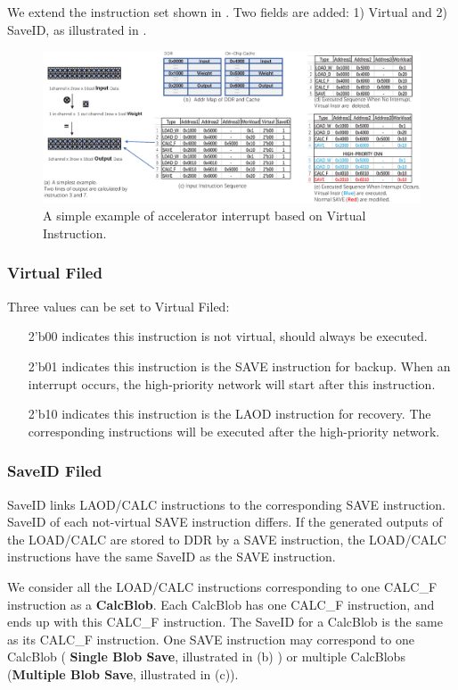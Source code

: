 We extend the instruction set shown in . Two fields are added: 1) Virtual and 2) SaveID, as illustrated in .

\begin{figure}[t]
	\centering
	\includegraphics[width=0.95\linewidth]{fig/interexample.eps}
	\caption{ A simple example of accelerator interrupt based on Virtual Instruction. }
	\label{fig:interexample}
\end{figure}

\subsubsection{ Virtual Filed}

Three values can be set to Virtual Filed:
\begin{itemize}
    \item[2'b00] indicates this instruction is not virtual, should always be executed.
    \item[2'b01] indicates this instruction is the SAVE instruction for backup. When an interrupt occurs, the high-priority network will start after this instruction.
    \item[2'b10] indicates this instruction is the LAOD instruction for recovery. The corresponding instructions will be executed after the high-priority network.
\end{itemize}

\subsubsection{ SaveID Filed }

SaveID links LAOD/CALC instructions to the corresponding SAVE instruction. SaveID of each not-virtual SAVE instruction differs. If the generated outputs of the LOAD/CALC are stored to DDR by a SAVE instruction, the LOAD/CALC instructions have the same SaveID as the SAVE instruction.

We consider all the LOAD/CALC instructions corresponding to one CALC\_F instruction as a \textbf{CalcBlob}. Each CalcBlob has one CALC\_F instruction, and ends up with this CALC\_F instruction. The SaveID for a CalcBlob is the same as its CALC\_F instruction.
One SAVE instruction may correspond to one CalcBlob ( \textbf{Single Blob Save}, illustrated in (b) ) or multiple CalcBlobs (\textbf{Multiple Blob Save}, illustrated in (c)).

